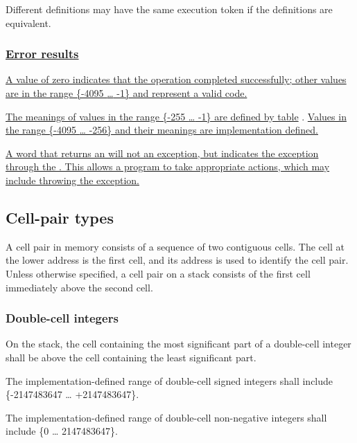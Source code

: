 Different definitions may have the same execution token if the
definitions are equivalent.

\cbstart{}
\subsubsection[Error results]{\uline{Error results}}
\label{usage:ior}

\uline{%
A value of zero indicates that the operation completed successfully;
other values are in the range \{-4095 {\ldots} -1\} and represent a
valid  code.}

\uline{%
The meanings of values in the range \{-255 {\ldots} -1\} are defined
by table} .
\uline{%
Values in the range \{-4095 {\ldots} -256\} and their meanings are
implementation defined.}

\uline{%
A word that returns an  will not  an exception,
but indicates the exception through the .  This allows a program
to take appropriate actions, which may include throwing the exception.}
\cbend

\subsection{Cell-pair types} %
\label{usage:2cell}

A cell pair in memory consists of a sequence of two contiguous
cells. The cell at the lower address is the first cell, and its
address is used to identify the cell pair. Unless otherwise
specified, a cell pair on a stack consists of the first cell
immediately above the second cell.

\subsubsection{Double-cell integers} %

On the stack, the cell containing the most significant part of a
double-cell integer shall be above the cell containing the least
significant part.

The implementation-defined range of double-cell signed integers
shall include \{-2147483647 {\ldots} \linebreak +2147483647\}.

The implementation-defined range of double-cell non-negative
integers shall include \{0 {\ldots} 2147483647\}.

